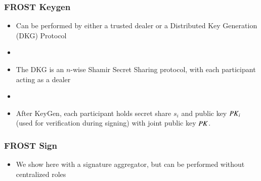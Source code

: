\documentclass[hyperref={pdfpagelabels=true},table,dvipsnames,14pt,aspectratio=169]{beamer}
\begin{document}
\begin{frame}
  \frametitle{FROST Keygen}

  \begin{itemize}
    \item<1-> Can be performed by either a trusted dealer or a Distributed Key
      Generation (DKG) Protocol
    \item[]
    \item<2-> The DKG is an $n$-wise Shamir Secret Sharing protocol, with each
      participant acting as a dealer
    \item[]
    \item<3> After KeyGen, each participant holds secret share $s_i$ and
      public key $\mathit{PK}_i$ (used for verification during signing) with joint public key $\mathit{PK}$.
  \end{itemize}
\end{frame}

\begin{frame}
  \frametitle{FROST Sign}

  \begin{itemize}
    \item<1-> We show here with a signature aggregator, but can be
      performed without centralized roles
  \end{itemize}
\end{frame}
\end{document}
